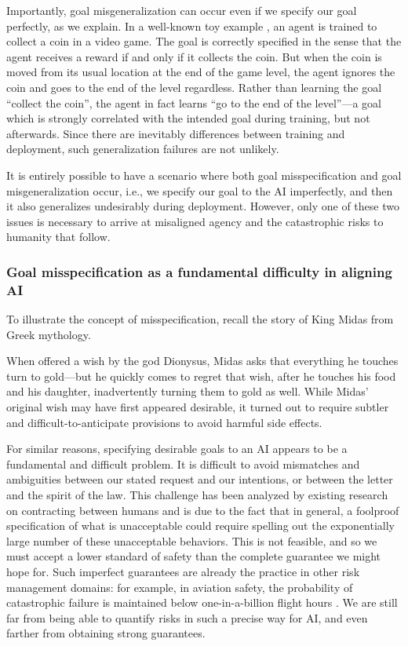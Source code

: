 Importantly, goal misgeneralization can occur even if we specify our goal perfectly, as we explain. In a well-known toy example \cite{proceedings.mlr.press.v162.langosco22a.html}, an agent is trained to collect a coin in a video game. The goal is correctly specified in the sense that the agent receives a reward if and only if it collects the coin. But when the coin is moved from its usual location at the end of the game level, the agent ignores the coin and goes to the end of the level regardless. Rather than learning the goal ``collect the coin'', the agent in fact learns ``go to the end of the level''---a goal which is strongly correlated with the intended goal during training, but not afterwards. Since there are inevitably differences between training and deployment, such generalization failures are not unlikely.

It is entirely possible to have a scenario where both goal misspecification and goal misgeneralization occur, i.e., we specify our goal to the AI imperfectly, and then it also generalizes undesirably during deployment. However, only one of these two issues is necessary to arrive at misaligned agency and the catastrophic risks to humanity that follow.

    \subsubsection{Goal misspecification as a fundamental difficulty in aligning AI}
    \label{sec:existential:misagencyreward:fundiff}

To illustrate the concept of misspecification, recall the story of King Midas from Greek mythology. 

When offered a wish by the god Dionysus, Midas asks that everything he touches turn to gold---but he quickly comes to regret that wish, after he touches his food and his daughter, inadvertently turning them to gold as well. 
While Midas' original wish may have first appeared desirable, it turned out to require subtler and difficult-to-anticipate provisions to avoid harmful side effects.

For similar reasons, specifying desirable goals to an AI appears to be a fundamental and difficult problem. It is difficult to avoid mismatches and ambiguities between our stated request and our intentions, or between the letter and the spirit of the law. This challenge has been analyzed by existing research on contracting between humans \cite{dl.acm.org.doi.abs.10.1145.3306618.3314250} and is due to the fact that in general, a foolproof specification of what is unacceptable could require spelling out the exponentially large number of these unacceptable behaviors. This is not feasible, and so we must accept a lower standard of safety than the complete guarantee we might hope for. Such imperfect guarantees are already the practice in other risk management domains: for example, in aviation safety, the probability of catastrophic failure is maintained below one-in-a-billion flight hours \cite{www.faa.gov.documentLibrary.media.Advisory.Circular.AC.25.1309.1A.pdf}. We are still far from being able to quantify risks in such a precise way for AI, and even farther from obtaining strong guarantees.

